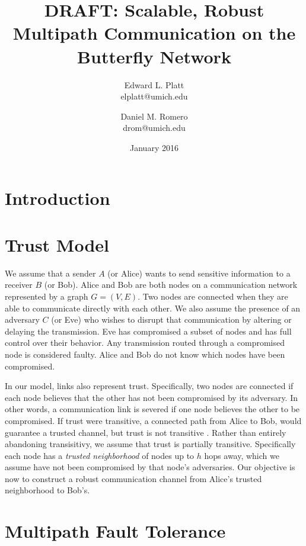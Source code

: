 \documentclass[twocolumn]{article}
\title{DRAFT: Scalable, Robust Multipath Communication on the Butterfly Network}
\author{
    Edward L. Platt\\
    elplatt@umich.edu
    \and
    Daniel M. Romero\\
    drom@umich.edu
}
\date{January 2016}
\begin{document}
\maketitle

\section{Introduction}

\section{Trust Model}

We assume that a sender $A$ (or Alice) wants to send sensitive information
to a receiver $B$ (or Bob).
Alice and Bob are both nodes on a communication network represented by a graph
$G = (V, E)$.
Two nodes are connected when they are able to communicate directly with each
other.
We also assume the presence of an adversary $C$ (or Eve) who wishes to disrupt
that communication by altering or delaying the transmission.
Eve has compromised a subset of nodes and has full control over their behavior.
Any transmission routed through a compromised node is considered faulty.
Alice and Bob do not know which nodes have been compromised.

In our model, links also represent trust.
Specifically, two nodes are connected if each node believes that the other
has not been compromised by its adversary.
In other words, a communication link is severed if one node believes the other
to be compromised.
If trust were transitive, a connected path from Alice to Bob, would guarantee
a trusted channel, but trust is not transitive \cite{christianson_why_1997}.
Rather than entirely abandoning transisitivy, we assume that trust is
partially transitive.
Specifically each node has a {\em trusted neighborhood} of nodes up to $h$ hops
away, which we assume have not been compromised by that node's adversaries.
Our objective is now to construct a robust communication channel from Alice's
trusted neighborhood to Bob's.

\section{Multipath Fault Tolerance}
\end{document}
